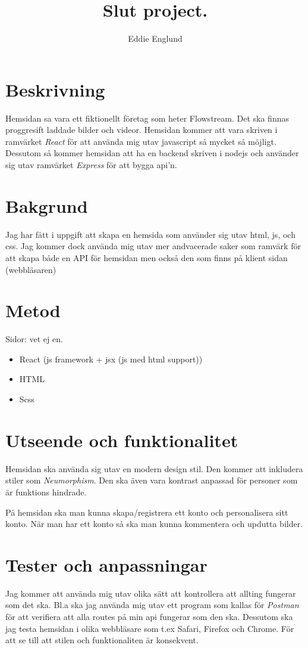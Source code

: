 \documentclass{article}
\title{Slut project.}
\author{Eddie Englund}
\begin{document}
    \maketitle


    \section{Beskrivning}

        Hemsidan sa vara ett fiktionellt företag som heter Flowstream. Det ska finnas proggresift laddade bilder och videor. Hemsidan kommer att vara skriven i ramvärket \textit{React} för att använda mig utav javascript så mycket så möjligt. Dessutom så kommer hemsidan att ha en backend skriven i nodejs och använder sig utav ramvärket \textit{Express} för att bygga api'n.
        
    \section{Bakgrund}
        Jag har fått i uppgift att skapa en hemsida som använder sig utav html, js, och css. Jag kommer dock använda mig utav mer andvacerade saker som ramvärk för att skapa både en API för hemsidan men också den som finns på klient sidan (webbläsaren)
    \section{Metod}
        Sidor: vet ej en.
        \begin{itemize}
            \item React (js framework + jsx (js med html support))
            \item HTML
            \item Scss
        \end{itemize}
    \section{Utseende och funktionalitet}
        Hemsidan ska använda sig utav en modern design stil. Den kommer att inkludera stiler som \textit{Neumorphism}. Den ska även vara kontrast anpassad för personer som är funktions hindrade.

        På hemsidan ska man kunna skapa/registrera ett konto och personalisera sitt konto. När man har ett konto så ska man kunna kommentera och updutta bilder.
    \section{Tester och anpassningar}
        Jag kommer att använda mig utav olika sätt att kontrollera att allting fungerar som det ska. Bl.a ska jag använda mig utav ett program som kallas för \textit{Postman} för att verifiera att alla routes på min api fungerar som den ska. Dessutom ska jag testa hemsidan i olika webbläsare som t.ex Safari, Firefox och Chrome. För att se till att stilen och funktionaliten är konsekvent.
\end{document}
